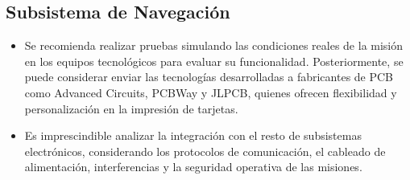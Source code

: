 \newpage

\subsection{Subsistema de Navegación}

\begin{itemize}
    \item Se recomienda realizar pruebas simulando las condiciones reales de la misión en los equipos tecnológicos para evaluar su funcionalidad. Posteriormente, se puede considerar enviar las tecnologías desarrolladas a fabricantes de PCB como Advanced Circuits, PCBWay y JLPCB, quienes ofrecen flexibilidad y personalización en la impresión de tarjetas.
    \item Es imprescindible analizar la integración con el resto de subsistemas electrónicos, considerando los protocolos de comunicación, el cableado de alimentación, interferencias y la seguridad operativa de las misiones.
\end{itemize}





